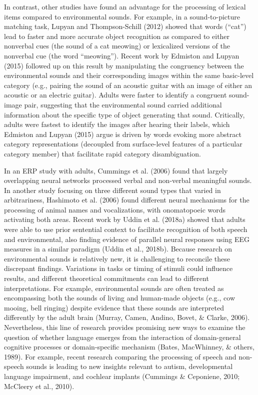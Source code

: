 \documentclass[english,floatsintext,man]{apa6}
\theoremstyle{definition}
\theoremstyle{definition}
\theoremstyle{definition}
\theoremstyle{remark}
\begin{document}
In contrast, other studies have found an advantage for the processing of
lexical items compared to environmental sounds. For example, in a
sound-to-picture matching task, Lupyan and Thompson-Schill (2012) showed
that words (\enquote{cat}) lead to faster and more accurate object
recognition as compared to either nonverbal cues (the sound of a cat
meowing) or lexicalized versions of the nonverbal cue (the word
\enquote{meowing}). Recent work by Edmiston and Lupyan (2015) followed
up on this result by manipulating the congruency between the
environmental sounds and their corresponding images within the same
basic-level category (e.g., pairing the sound of an acoustic guitar with
an image of either an acoustic or an electric guitar). Adults were
faster to identify a congruent sound-image pair, suggesting that the
environmental sound carried additional information about the specific
type of object generating that sound. Critically, adults were fastest to
identify the images after hearing their labels, which Edmiston and
Lupyan (2015) argue is driven by words evoking more abstract category
representations (decoupled from surface-level features of a particular
category member) that facilitate rapid category disambiguation.

In an ERP study with adults, Cummings et al. (2006) found that largely
overlapping neural networks processed verbal and non-verbal meaningful
sounds. In another study focusing on three different sound types that
varied in arbitrariness, Hashimoto et al. (2006) found different neural
mechanisms for the processing of animal names and vocalizations, with
onomatopoeic words activating both areas. Recent work by Uddin et al.
(2018a) showed that adults were able to use prior sentential context to
facilitate recognition of both speech and environmental, also finding
evidence of parallel neural responses using EEG measures in a similar
paradigm (Uddin et al., 2018b). Because research on environmental sounds
is relatively new, it is challenging to reconcile these discrepant
findings. Variations in tasks or timing of stimuli could influence
results, and different theoretical commitments can lead to different
interpretations. For example, environmental sounds are often treated as
encompassing both the sounds of living and human-made objects (e.g., cow
mooing, bell ringing) despite evidence that these sounds are interpreted
differently by the adult brain (Murray, Camen, Andino, Bovet, \& Clarke,
2006). Nevertheless, this line of research provides promising new ways
to examine the question of whether language emerges from the interaction
of domain-general cognitive processes or domain-specific mechanism
(Bates, MacWhinney, \& others, 1989). For example, recent research
comparing the processing of speech and non-speech sounds is leading to
new insights relevant to autism, developmental language impairment, and
cochlear implants (Cummings \& Ceponiene, 2010; McCleery et al., 2010).
\end{document}
